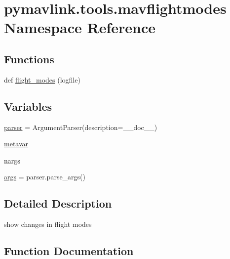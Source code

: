 \hypertarget{namespacepymavlink_1_1tools_1_1mavflightmodes}{}\section{pymavlink.\+tools.\+mavflightmodes Namespace Reference}
\label{namespacepymavlink_1_1tools_1_1mavflightmodes}
\subsection*{Functions}
\begin{DoxyCompactItemize}
\item 
def \mbox{\hyperlink{namespacepymavlink_1_1tools_1_1mavflightmodes_adb722ae42af4f6a3a13aa8bd170193ee}{flight\+\_\+modes}} (logfile)
\end{DoxyCompactItemize}
\subsection*{Variables}
\begin{DoxyCompactItemize}
\item 
\mbox{\hyperlink{namespacepymavlink_1_1tools_1_1mavflightmodes_a4e8c10ce50a5690792657671d8f4fc78}{parser}} = Argument\+Parser(description=\+\_\+\+\_\+doc\+\_\+\+\_\+)
\item 
\mbox{\hyperlink{namespacepymavlink_1_1tools_1_1mavflightmodes_a3f6cc982384aa9be3c7f21553c53fa2e}{metavar}}
\item 
\mbox{\hyperlink{namespacepymavlink_1_1tools_1_1mavflightmodes_abbd1eb5fa59b5fcd30ca67fd61d1834b}{nargs}}
\item 
\mbox{\hyperlink{namespacepymavlink_1_1tools_1_1mavflightmodes_a5381f7691451a113ba563a0d769c3352}{args}} = parser.\+parse\+\_\+args()
\end{DoxyCompactItemize}


\subsection{Detailed Description}
\begin{DoxyVerb}show changes in flight modes
\end{DoxyVerb}
 

\subsection{Function Documentation}
\mbox{\label{namespacepymavlink_1_1tools_1_1mavflightmodes_adb722ae42af4f6a3a13aa8bd170193ee}} 
